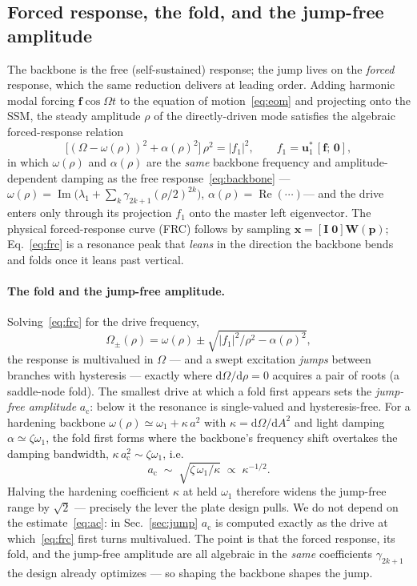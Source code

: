 \documentclass[11pt]{article}
\newcommand{\dd}{\mathrm{d}}
\DeclareMathOperator{\Imag}{Im}
\DeclareMathOperator{\Real}{Re}
\begin{document}
\subsection{Forced response, the fold, and the jump-free amplitude}\label{sec:frc}
The backbone is the free (self-sustained) response; the jump lives on the \emph{forced}
response, which the same reduction delivers at leading order. Adding harmonic modal
forcing $\bm f\cos\Omega t$ to the equation of motion~\eqref{eq:eom} and projecting onto
the SSM, the steady amplitude $\rho$ of the directly-driven mode satisfies the algebraic
forced-response relation
\begin{equation}
\big[(\Omega-\omega(\rho))^2+\alpha(\rho)^2\big]\,\rho^2=|f_1|^2,\qquad
f_1=\bm u_1^{*}\,[\bm f;\,\bm0],
\label{eq:frc}
\end{equation}
in which $\omega(\rho)$ and $\alpha(\rho)$ are the \emph{same} backbone frequency and
amplitude-dependent damping as the free response~\eqref{eq:backbone}
---$\omega(\rho)=\Imag\!\big(\lambda_1+\sum_k\gamma_{2k+1}(\rho/2)^{2k}\big)$,
$\alpha(\rho)=\Real(\cdots)$--- and the drive enters only through its projection $f_1$
onto the master left eigenvector. The physical forced-response curve (FRC) follows by
sampling $\bm x=[\bm I\;\bm0]\bm W(\bm p)$; Eq.~\eqref{eq:frc} is a resonance peak that
\emph{leans} in the direction the backbone bends and folds once it leans past vertical.

\paragraph{The fold and the jump-free amplitude.} Solving~\eqref{eq:frc} for the drive
frequency,
\begin{equation}
\Omega_\pm(\rho)=\omega(\rho)\pm\sqrt{|f_1|^2/\rho^2-\alpha(\rho)^2},
\label{eq:frcbranch}
\end{equation}
the response is multivalued in $\Omega$ --- and a swept excitation \emph{jumps} between
branches with hysteresis --- exactly where $\dd\Omega/\dd\rho=0$ acquires a pair of roots
(a saddle-node fold). The smallest drive at which a fold first appears sets the
\emph{jump-free amplitude} $a_{\mathrm c}$: below it the resonance is single-valued and
hysteresis-free. For a hardening backbone $\omega(\rho)\simeq\omega_1+\kappa\,a^2$ with
$\kappa=\dd\Omega/\dd A^2$ and light damping $\alpha\simeq\zeta\omega_1$, the fold first
forms where the backbone's frequency shift overtakes the damping bandwidth,
$\kappa\,a_{\mathrm c}^2\sim\zeta\omega_1$, i.e.
\begin{equation}
a_{\mathrm c}\;\sim\;\sqrt{\zeta\,\omega_1/\kappa}\;\propto\;\kappa^{-1/2}.
\label{eq:ac}
\end{equation}
Halving the hardening coefficient $\kappa$ at held $\omega_1$ therefore widens the
jump-free range by $\sqrt2$ --- precisely the lever the plate design pulls. We do not
depend on the estimate~\eqref{eq:ac}: in Sec.~\ref{sec:jump} $a_{\mathrm c}$ is computed
exactly as the drive at which~\eqref{eq:frc} first turns multivalued. The point is that
the forced response, its fold, and the jump-free amplitude are all algebraic in the
\emph{same} coefficients $\gamma_{2k+1}$ the design already optimizes --- so shaping the
backbone shapes the jump.
\end{document}
